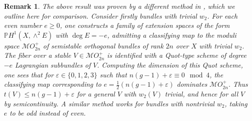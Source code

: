 \documentclass[10pt]{amsart}
\numberwithin{equation}{section}
\newcommand{\pp}{\mathbb P}
\newcommand{\ba}{\mathbb A}
\newcommand{\MO}{\mathcal{MO}}
\newtheorem{rmk}[theorem]{{\textbf Remark}}
\newenvironment{remark}{\begin{rmk}\rm}{\end{rmk}}
\begin{document}
\begin{remark} \label{quotarg} The above result was proven by a different method in \cite[\S 5]{CH3}, which we outline here for comparison. Consider firstly bundles with trivial $w_2$. For each even number $e \ge 0$, one constructs a family of extension spaces of the form $\pp H^1 (X, \wedge^2 E)$ with $\deg E = -e$, admitting a classifying map to the moduli space ${\mathcal MO}_{2n}^+$ of semistable orthogonal bundles of rank $2n$ over $X$ with trivial $w_2$. The fiber over a stable $V \in {\mathcal MO}_{2n}^+$ is identified with a Quot-type scheme of degree $-e$ Lagrangian subbundles of $V$. Computing the dimension of this Quot scheme, one sees that for $\varepsilon \in \{ 0, 1, 2, 3 \}$ such that $n(g-1) + \varepsilon \equiv 0 \mod 4$, the classifying map corresponding to $e = \frac{1}{2}(n(g-1) + \varepsilon)$ dominates ${\mathcal MO}_{2n}^+$. Thus $t(V) \le n(g-1) + \varepsilon$ for a general $V$ with $w_2(V)$ trivial, and hence for all $V$ by semicontinuity. A similar method works for bundles with nontrivial $w_2$, taking $e$ to be odd instead of even.
\end {remark}
\end{document}
